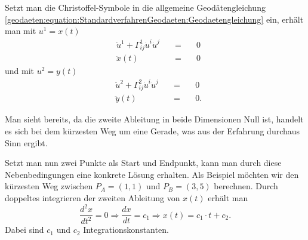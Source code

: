 Setzt man die Christoffel-Symbole in die allgemeine Geodätengleichung \eqref{geodaeten:equation:StandardverfahrenGeodaeten:Geodaetengleichung} ein, erhält man mit $u^1 = x(t)$
\begin{equation}
	\begin{alignedat}{3}
		&\ddot{u}^1 + \Gamma_{ij}^1 \dot{u}^i \dot{u}^j &\quad = \quad& 0 \\
		&\ddot{x}(t) &\quad = \quad& 0
	\end{alignedat}
	\label{geodaeten:equation:Standardverfahren:Kartesisch:x}
\end{equation}
und mit $u^2 = y(t)$
\begin{equation}
	\begin{alignedat}{3}
		&\ddot{u}^2 + \Gamma_{ij}^2 \dot{u}^i \dot{u}^j &\quad = \quad& 0 \\
		&\ddot{y}(t) &\quad = \quad& 0  .
	\end{alignedat}
	\label{geodaeten:equation:Standardverfahren:Kartesisch:y}
\end{equation}

Man sieht bereits, da die zweite Ableitung in beide Dimensionen Null ist, handelt es sich bei dem kürzesten Weg um eine Gerade, was aus der Erfahrung durchaus Sinn ergibt.

Setzt man nun zwei Punkte als Start und Endpunkt, kann man durch diese Nebenbedingungen eine konkrete Lösung erhalten.
Als Beispiel möchten wir den kürzesten Weg zwischen $P_A = (1,1)$ und $P_B = (3,5)$ berechnen. 
Durch doppeltes integrieren der zweiten Ableitung von $x(t)$ erhält man
\begin{equation}
	\frac{d^2x}{dt^2} = 0 
	\Rightarrow \frac{dx}{dt} = c_1 
	\Rightarrow x(t) = c_1 \cdot t + c_2  .
	\label{geodaeten:equation:Standardverfahren:Kartesisch:equation1}
\end{equation}
Dabei sind $c_1$  und $c_2$ Integrationskonstanten. 

